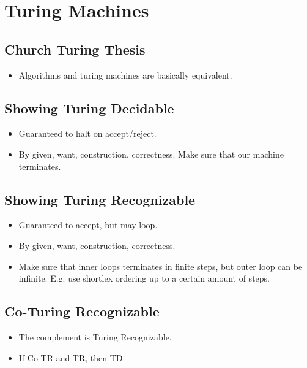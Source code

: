 \documentclass{article}
\begin{document}
\section{Turing Machines}
\subsection{Church Turing Thesis}
\begin{itemize}
    \item Algorithms and turing machines are basically equivalent.
\end{itemize}
\subsection{Showing Turing Decidable}
\begin{itemize}
    \item Guaranteed to halt on accept/reject.
    \item By given, want, construction, correctness. Make sure that our machine terminates.
\end{itemize}

\subsection{Showing Turing Recognizable}
\begin{itemize}
    \item Guaranteed to accept, but may loop.
    \item By given, want, construction, correctness.
    \item Make sure that inner loops terminates in finite steps, but outer loop can be infinite. E.g. use shortlex ordering up to a certain amount of steps.
\end{itemize}

\subsection{Co-Turing Recognizable}
\begin{itemize}
    \item The complement is Turing Recognizable.
    \item If Co-TR and TR, then TD.
\end{itemize}
\end{document}
